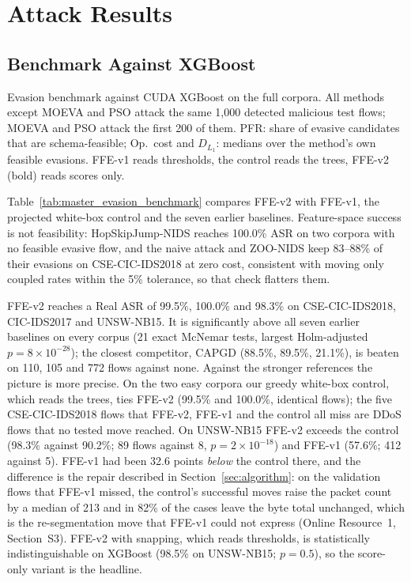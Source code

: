 \section{Attack Results}
\label{sec:results}

\subsection{Benchmark Against XGBoost}
\label{sec:master}

\begin{table}[!htbp]
\centering
\caption{Evasion benchmark against CUDA XGBoost on the full corpora. All methods except MOEVA and PSO attack the same 1,000 detected malicious test flows; MOEVA and PSO attack the first 200 of them. PFR: share of evasive candidates that are schema-feasible; Op.\ cost and $D_{L_1}$: medians over the method's own feasible evasions. FFE-v1 reads thresholds, the control reads the trees, FFE-v2 (bold) reads scores only.}\label{tab:master_evasion_benchmark}
\resizebox{\textwidth}{!}{\begin{varwidth}{\maxdimen}\noindent%
%
\end{varwidth}}
\end{table}

Table~\ref{tab:master_evasion_benchmark} compares FFE-v2 with FFE-v1, the projected white-box control and the seven earlier baselines. Feature-space success is not feasibility: HopSkipJump-NIDS reaches 100.0\% ASR on two corpora with no feasible evasive flow, and the naive attack and ZOO-NIDS keep 83--88\% of their evasions on CSE-CIC-IDS2018 at zero cost, consistent with moving only coupled rates within the 5\% tolerance, so that check flatters them.

FFE-v2 reaches a Real ASR of 99.5\%, 100.0\% and 98.3\% on CSE-CIC-IDS2018, CIC-IDS2017 and UNSW-NB15. It is significantly above all seven earlier baselines on every corpus (21 exact McNemar tests, largest Holm-adjusted $p=8\times10^{-28}$); the closest competitor, CAPGD (88.5\%, 89.5\%, 21.1\%), is beaten on 110, 105 and 772 flows against none. Against the stronger references the picture is more precise. On the two easy corpora our greedy white-box control, which reads the trees, ties FFE-v2 (99.5\% and 100.0\%, identical flows); the five CSE-CIC-IDS2018 flows that FFE-v2, FFE-v1 and the control all miss are DDoS flows that no tested move reached. On UNSW-NB15 FFE-v2 exceeds the control (98.3\% against 90.2\%; 89 flows against 8, $p=2\times10^{-18}$) and FFE-v1 (57.6\%; 412 against 5). FFE-v1 had been 32.6 points \emph{below} the control there, and the difference is the repair described in Section~\ref{sec:algorithm}: on the validation flows that FFE-v1 missed, the control's successful moves raise the packet count by a median of 213 and in 82\% of the cases leave the byte total unchanged, which is the re-segmentation move that FFE-v1 could not express (Online Resource~1, Section~S3). FFE-v2 with snapping, which reads thresholds, is statistically indistinguishable on XGBoost (98.5\% on UNSW-NB15; $p=0.5$), so the score-only variant is the headline.

